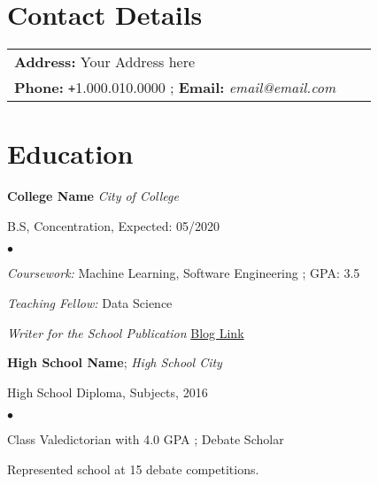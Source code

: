 \documentclass[margin,line]{res}
\newenvironment{list1}{
  \begin{list}{\ding{113}}{%
      \setlength{\itemsep}{0in}
      \setlength{\parsep}{0in} \setlength{\parskip}{0in}
      \setlength{\topsep}{0in} \setlength{\partopsep}{0in}
      \setlength{\leftmargin}{0.17in}}}{\end{list}}
\newenvironment{list2}{
  \begin{list}{$\bullet$}{%
      \setlength{\itemsep}{0in}
      \setlength{\parsep}{0in} \setlength{\parskip}{0in}
      \setlength{\topsep}{0in} \setlength{\partopsep}{0in}
      \setlength{\leftmargin}{0.15in}}}{\end{list}}
\begin{document}

\begin{resume}
\section{\sc Contact Details}
\vspace{.05in}

\begin{tabular}{@{}p{35in}p{.55in}p{1in}}

{\bf Address:} Your Address here\\
{\bf Phone: }\texttt{+}1.000.010.0000 ;       
{\bf Email:} \emph{email@email.com}\\

\end{tabular}


\section{\sc Education}
{\bf College Name}
\hfill{\emph{City of College}}\\
\vspace{-.4cm}

\begin{list1}
\item[] B.S, Concentration, Expected: 05/2020
\begin{list2}
\vspace*{.05in}
\item \emph{Coursework:} Machine Learning, Software Engineering ; GPA: 3.5
\item \emph{Teaching Fellow:} Data Science
\item \emph{Writer for the School Publication}
\href{https://www.google.com}{Blog Link}
\end{list2}
\end{list1}
\vspace*{.025in}

{\bf High School Name};
\hfill{\emph{High School City}}\\
\vspace{-.4cm}
\begin{list1}
\item[] High School Diploma, Subjects, 2016
\begin{list2}
\vspace*{.05in}
\item Class Valedictorian with 4.0 GPA ; Debate Scholar
\item Represented school at 15 debate competitions.


\end{list2}
\end{list1}
\end{resume}
\end{document}
